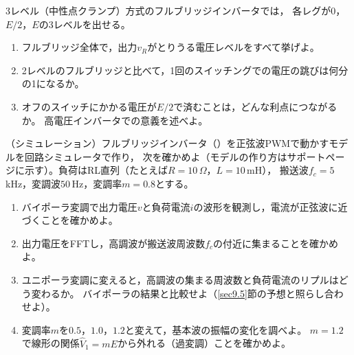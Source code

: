 \begin{章末問題}
\item \label{ex9.7}3レベル（中性点クランプ）方式のフルブリッジインバータでは，
各レグが$0$，$E/2$，$E$の3レベルを出せる。
\begin{enumerate}
\item[(a)] フルブリッジ全体で，出力$v_R$がとりうる電圧レベルをすべて挙げよ。
\item[(b)] 2レベルのフルブリッジと比べて，1回のスイッチングでの電圧の跳びは何分の1になるか。
\item[(c)] オフのスイッチにかかる電圧が$E/2$で済むことは，どんな利点につながるか。
高電圧インバータでの意義を述べよ。
\end{enumerate}

\item \label{ex9.8}（シミュレーション）フルブリッジインバータ（）を正弦波PWMで動かすモデルを回路シミュレータで作り，
次を確かめよ（モデルの作り方はサポートページに示す）。負荷はRL直列（たとえば$R = 10\,\Omega$，$L = 10$\,mH），
搬送波$f_c = 5$\,kHz，変調波$50$\,Hz，変調率$m = 0.8$とする。
\begin{enumerate}
\item[(a)] バイポーラ変調で出力電圧$v$と負荷電流$i$の波形を観測し，電流が正弦波に近づくことを確かめよ。
\item[(b)] 出力電圧をFFTし，高調波が搬送波周波数$f_c$の付近に集まることを確かめよ。
\item[(c)] ユニポーラ変調に変えると，高調波の集まる周波数と負荷電流のリプルはどう変わるか。
バイポーラの結果と比較せよ（\ref{sec9.5}節の予想と照らし合わせよ）。
\item[(d)] 変調率$m$を$0.5$，$1.0$，$1.2$と変えて，基本波の振幅の変化を調べよ。
$m = 1.2$で線形の関係$\hat{V}_1 = mE$から外れる（過変調）ことを確かめよ。
\end{enumerate}
\end{章末問題}
